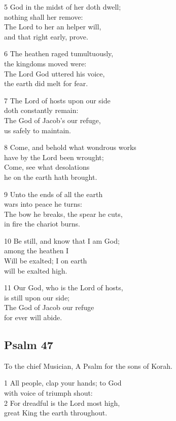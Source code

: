 5 God in the midst of her doth dwell;\\
nothing shall her remove:\\
The Lord to her an helper will,\\
and that right early, prove.

6 The heathen raged tumultuously,\\
the kingdoms moved were:\\
The Lord God uttered his voice,\\
the earth did melt for fear.

7 The Lord of hosts upon our side\\
doth constantly remain:\\
The God of Jacob’s our refuge,\\
us safely to maintain.

8 Come, and behold what wondrous works\\
have by the Lord been wrought;\\
Come, see what desolations\\
he on the earth hath brought.

9 Unto the ends of all the earth\\
wars into peace he turns:\\
The bow he breaks, the spear he cuts,\\
in fire the chariot burns.

10 Be still, and know that I am God;\\
among the heathen I\\
Will be exalted; I on earth\\
will be exalted high.

11 Our God, who is the Lord of hosts,\\
is still upon our side;\\
The God of Jacob our refuge\\
for ever will abide.

\begin{center}
\quad{}\quad{}
\end{center}

\subsection*{Psalm 47}

To the chief Musician,
A Psalm for the sons of Korah.

1 All people, clap your hands; to God\\
with voice of triumph shout:\\
2 For dreadful is the Lord most high,\\
great King the earth throughout.

